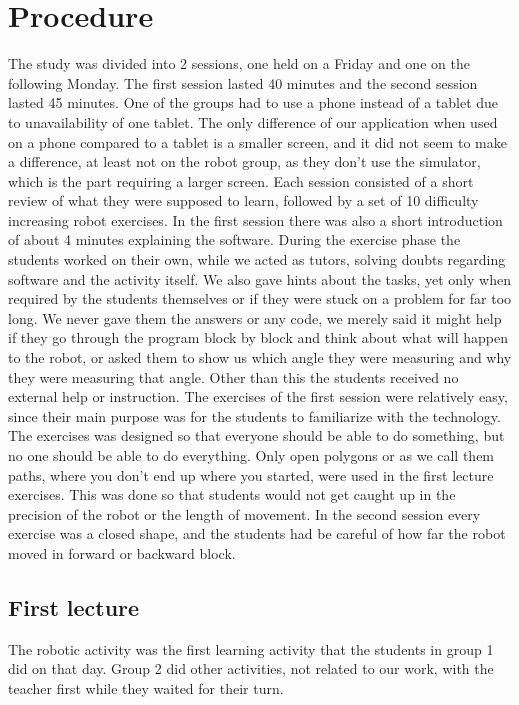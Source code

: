 \chapter{Procedure}
The study was divided into 2 sessions, one held on a Friday and one on the following Monday. The first session lasted 40 minutes and the second session lasted 45 minutes. 
One of the groups had to use a phone instead of a tablet due to unavailability of one tablet. 
The only difference of our application when used on a phone compared to a tablet is a smaller screen, and it did not seem to make a difference, at least not on the robot group, as they don't use the simulator, which is the part requiring a larger screen. Each session consisted of a short review of what they were supposed to learn, followed by a set of 10 difficulty increasing robot exercises. In the first session there was also a short introduction of about 4 minutes explaining the software. During the exercise phase the students worked on their own, while we acted as tutors, solving doubts regarding software and the activity itself. We also gave hints about the tasks, yet only when required by the students themselves or if they were stuck on a problem for far too long. We never gave them the answers or any code, we merely said it might help if they go through the program block by block and think about what will happen to the robot, or asked them to show us which angle they were measuring and why they were measuring that angle. Other than this the students received no external help or instruction. The exercises of the first session were relatively easy, since their main purpose was for the students to familiarize with the technology. The exercises was designed so that everyone should be able to do something, but no one should be able to do everything. Only open polygons or as we call them paths, where you don't end up where you started, were used in the first lecture exercises. This was done so that students would not get caught up in the precision of the robot or the length of movement. In the second session every exercise was a closed shape, and the students had be careful of how far the robot moved in forward or backward block.  

\section{First lecture}
The robotic activity was the first learning activity that the students in group 1 did on that day. 
Group 2 did other activities, not related to our work, with the teacher first while they waited for their turn.

